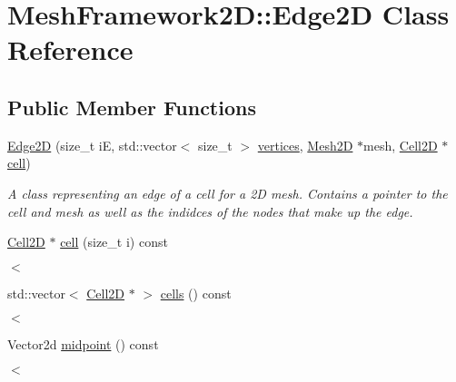 \hypertarget{classMeshFramework2D_1_1Edge2D}{}\section{Mesh\+Framework2D\+:\+:Edge2D Class Reference}
\label{classMeshFramework2D_1_1Edge2D}
\subsection*{Public Member Functions}
\begin{DoxyCompactItemize}
\item 
\hyperlink{classMeshFramework2D_1_1Edge2D_af3b982ed5bedc795c29e621a675a9137}{Edge2D} (size\+\_\+t iE, std\+::vector$<$ size\+\_\+t $>$ \hyperlink{classMeshFramework2D_1_1Edge2D_a7343e846b9a43d408d8874b8322736fc}{vertices}, \hyperlink{classMeshFramework2D_1_1Mesh2D}{Mesh2D} $\ast$mesh, \hyperlink{classMeshFramework2D_1_1Cell2D}{Cell2D} $\ast$\hyperlink{classMeshFramework2D_1_1Edge2D_aec9ba58af7a02bd31c4275edde79b5c6}{cell})
\begin{DoxyCompactList}\small\item\em A class representing an edge of a cell for a 2D mesh. Contains a pointer to the cell and mesh as well as the indidces of the nodes that make up the edge. \end{DoxyCompactList}\item 
\hyperlink{classMeshFramework2D_1_1Cell2D}{Cell2D} $\ast$ \hyperlink{classMeshFramework2D_1_1Edge2D_aec9ba58af7a02bd31c4275edde79b5c6}{cell} (size\+\_\+t i) const
\begin{DoxyCompactList}\small\item\em $<$ \end{DoxyCompactList}\item 
std\+::vector$<$ \hyperlink{classMeshFramework2D_1_1Cell2D}{Cell2D} $\ast$ $>$ \hyperlink{classMeshFramework2D_1_1Edge2D_ace0d55a3215e0f99b35d6b641795b9ed}{cells} () const
\begin{DoxyCompactList}\small\item\em $<$ \end{DoxyCompactList}\item 
Vector2d \hyperlink{classMeshFramework2D_1_1Edge2D_ab46a6e8b887554b59d4e7fd7cbcdcb7d}{midpoint} () const
\begin{DoxyCompactList}\small\item\em $<$ \end{DoxyCompactList}\item 

\end{DoxyCompactItemize}
